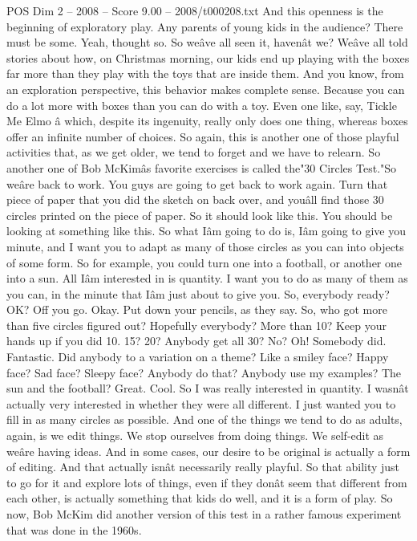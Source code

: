 \begin{textsample}{POS Dim 2 – 2008 – Score 9.00 – 2008/t000208.txt}
And this openness is the beginning of exploratory play.
Any parents of young kids in the audience?
There must be some.
Yeah, thought so.
So weâve all seen it, havenât we?
Weâve all told stories about how, on Christmas morning, our kids end up playing with the boxes far more than they play with the toys that are inside them.
And you know, from an exploration perspective, this behavior makes complete sense.
Because you can do a lot more with boxes than you can do with a toy.
Even one like, say, Tickle Me Elmo â which, despite its ingenuity, really only does one thing, whereas boxes offer an infinite number of choices.
So again, this is another one of those playful activities that, as we get older, we tend to forget and we have to relearn.
So another one of Bob McKimâs favorite exercises is called the"30 Circles Test."So weâre back to work.
You guys are going to get back to work again.
Turn that piece of paper that you did the sketch on back over, and youâll find those 30 circles printed on the piece of paper.
So it should look like this.
You should be looking at something like this.
So what Iâm going to do is, Iâm going to give you minute, and I want you to adapt as many of those circles as you can into objects of some form.
So for example, you could turn one into a football, or another one into a sun.
All Iâm interested in is quantity.
I want you to do as many of them as you can, in the minute that Iâm just about to give you.
So, everybody ready?
OK?
Off you go.
Okay.
Put down your pencils, as they say.
So, who got more than five circles figured out?
Hopefully everybody?
More than 10?
Keep your hands up if you did 10. 15? 20?
Anybody get all 30?
No?
Oh!
Somebody did.
Fantastic.
Did anybody to a variation on a theme?
Like a smiley face?
Happy face?
Sad face?
Sleepy face?
Anybody do that?
Anybody use my examples?
The sun and the football?
Great.
Cool.
So I was really interested in quantity.
I wasnât actually very interested in whether they were all different.
I just wanted you to fill in as many circles as possible.
And one of the things we tend to do as adults, again, is we edit things.
We stop ourselves from doing things.
We self-edit as weâre having ideas.
And in some cases, our desire to be original is actually a form of editing.
And that actually isnât necessarily really playful.
So that ability just to go for it and explore lots of things, even if they donât seem that different from each other, is actually something that kids do well, and it is a form of play.
So now, Bob McKim did another version of this test in a rather famous experiment that was done in the 1960s.

\end{textsample}
